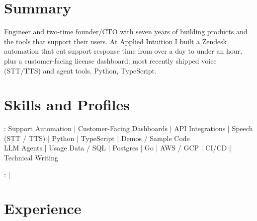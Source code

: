 \documentclass[print]{jack-resume}
\begin{document}
\pagecolor{darkmodeBackground}


\begin{minipage}[t][1cm][t]{.03\textwidth}
    \hfill
\end{minipage}

\section{Summary}
Engineer and two-time founder/CTO with seven years of building products and the tools that support their users. At Applied Intuition I built a Zendesk automation that cut support response time from over a day to under an hour, plus a customer-facing license dashboard; most recently shipped voice (STT/TTS) and agent tools. Python, TypeScript.
\sectionsep

\section{Skills and Profiles}
:
Support Automation \hfill | \hfill
Customer-Facing Dashboards \hfill | \hfill
API Integrations \hfill | \hfill
Speech (STT / TTS) \hfill | \hfill
Python \hfill | \hfill
TypeScript \hfill | \hfill
Demos / Sample Code \\
\hspace{1.0cm} LLM Agents \hfill | \hfill
Usage Data / SQL \hfill | \hfill
Postgres \hfill | \hfill
Go \hfill | \hfill
AWS / GCP \hfill | \hfill
CI/CD \hfill | \hfill
Technical Writing \\

\raggedright{
    :
      \href{https://www.linkedin.com/in/jack-sturtevant/}{ \ExternalLink} |
     \href{https://github.com/jacksturt}{ \ExternalLink}}

\section{Experience}
\end{document}
